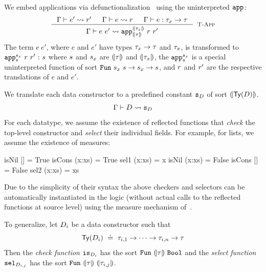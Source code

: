 %
We embed applications via
defunctionalization~\citep{Reynolds72}
using the uninterpreted $\texttt{app}^{}_{}$:
%
$$
\inference{
	\tologicshort{\env}{e'}{\typ_x}{\pred'}{\embed{\typ_x}}{\smtenv}{\axioms'}
	&
	\tologicshort{\env}{e}{\tfun{x}{\typ_x}{\typ}}{\pred}{\tsmtfun{\embed{\typ_x}}{\embed{\typ}}}{\smtenv}{\axioms}
	&
	\hastype{\env}{e}{{\typ_x}\rightarrow{\typ}}
}{
	\tologicshort{\env}{e\ e'}{\typ}{\smtappname{\embed{\typ_x}}{\embed{\typ}}\ {\pred}\ {\pred'}}{\embed{\typ}}{\smtenv}{\andaxioms{\axioms}{\axioms'}}
}[\lgapp]
$$
%
The term ${e\ e'}$, where $e$ and $e'$ have
types ${\tau_x \rightarrow \tau}$ and $\tau_x$,
is transformed to
${\tbind{\smtappname{\sort_x}{\sort}\ \pred\ \pred'}{\sort}}$
where
%
$s$ and $s_x$ are $(\!|\tau|\!)$ and $(\!|\tau_x|\!)$,
the
${\texttt{app}^{s_x}_{s}}$
is a special uninterpreted function of sort
${\mathtt{Fun}\ {s_x}\ {s} \rightarrow s_x \rightarrow s}$,
and
$r$ and $r'$ are the respective translations of $e$ and $e'$.


%
We translate each data constructor to a
predefined \smtlan constant ${\texttt{s}_{D}}$ of
sort ${(\!|\mathsf{Ty}({D})|\!)}$.
$$
	 \Gamma\vdash D \rightsquigarrow \texttt{s}_{D} 
$$
%
For each datatype, we assume the existence of reflected functions that
\emph{check} the top-level constructor
and \emph{select} their individual fields.
%
For example, for lists, we assume the existence of measures:
%
\begin{mcode}
    isNil []     = True         isCons (x:xs) = True          sel1 (x:xs) = x
    isNil (x:xs) = False        isCons []     = False         sel2 (x:xs) = xs
\end{mcode}
%
Due to the simplicity of their syntax the above checkers and selectors
can be automatically instantiated in the logic
(\ie without actual calls to the reflected functions at source level)
using the measure mechanism of~\citet{Vazou15}.

To generalize, let $D_i$ be a data constructor such that
$$
\mathsf{Ty}({D_i}) \ \doteq\  \tau_{i,1} \rightarrow \dots \rightarrow \tau_{i,n} \rightarrow \tau
$$
Then the \emph{check function}
${\texttt{is}_{{D_i}}}$ has the sort
$\mathtt{Fun}\ {(\!|\tau|\!)}\ {\mathtt{Bool}}$
and the \emph{select function}
${\texttt{sel}_{{D}_{i,j}}}$ has the sort
$\mathtt{Fun}\ {(\!|\tau|\!)}\ {(\!|\tau_{i,j}|\!)}$.
%


